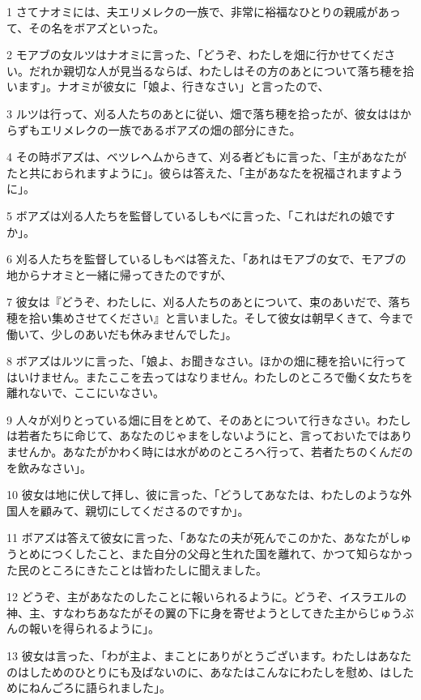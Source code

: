 \par 1 さてナオミには、夫エリメレクの一族で、非常に裕福なひとりの親戚があって、その名をボアズといった。
\par 2 モアブの女ルツはナオミに言った、「どうぞ、わたしを畑に行かせてください。だれか親切な人が見当るならば、わたしはその方のあとについて落ち穂を拾います」。ナオミが彼女に「娘よ、行きなさい」と言ったので、
\par 3 ルツは行って、刈る人たちのあとに従い、畑で落ち穂を拾ったが、彼女ははからずもエリメレクの一族であるボアズの畑の部分にきた。
\par 4 その時ボアズは、ベツレヘムからきて、刈る者どもに言った、「主があなたがたと共におられますように」。彼らは答えた、「主があなたを祝福されますように」。
\par 5 ボアズは刈る人たちを監督しているしもべに言った、「これはだれの娘ですか」。
\par 6 刈る人たちを監督しているしもべは答えた、「あれはモアブの女で、モアブの地からナオミと一緒に帰ってきたのですが、
\par 7 彼女は『どうぞ、わたしに、刈る人たちのあとについて、束のあいだで、落ち穂を拾い集めさせてください』と言いました。そして彼女は朝早くきて、今まで働いて、少しのあいだも休みませんでした」。
\par 8 ボアズはルツに言った、「娘よ、お聞きなさい。ほかの畑に穂を拾いに行ってはいけません。またここを去ってはなりません。わたしのところで働く女たちを離れないで、ここにいなさい。
\par 9 人々が刈りとっている畑に目をとめて、そのあとについて行きなさい。わたしは若者たちに命じて、あなたのじゃまをしないようにと、言っておいたではありませんか。あなたがかわく時には水がめのところへ行って、若者たちのくんだのを飲みなさい」。
\par 10 彼女は地に伏して拝し、彼に言った、「どうしてあなたは、わたしのような外国人を顧みて、親切にしてくださるのですか」。
\par 11 ボアズは答えて彼女に言った、「あなたの夫が死んでこのかた、あなたがしゅうとめにつくしたこと、また自分の父母と生れた国を離れて、かつて知らなかった民のところにきたことは皆わたしに聞えました。
\par 12 どうぞ、主があなたのしたことに報いられるように。どうぞ、イスラエルの神、主、すなわちあなたがその翼の下に身を寄せようとしてきた主からじゅうぶんの報いを得られるように」。
\par 13 彼女は言った、「わが主よ、まことにありがとうございます。わたしはあなたのはしためのひとりにも及ばないのに、あなたはこんなにわたしを慰め、はしためにねんごろに語られました」。
